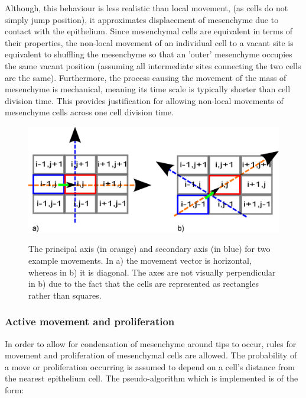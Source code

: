 \documentclass[pdftex,10pt,a4paper,twocolumn]{article}
\begin{document}
Although, this behaviour is less realistic than local movement, (as cells do not simply jump position), it approximates displacement of mesenchyme due to contact with the epithelium. Since mesenchymal cells are equivalent in terms of their properties, the non-local movement of an individual cell to a vacant site is equivalent to shuffling the mesenchyme so that an 'outer' mesenchyme occupies the same vacant position (assuming all intermediate sites connecting the two cells are the same). Furthermore, the process causing the movement of the mass of mesenchyme is mechanical, meaning its time scale is typically shorter than cell division time. This provides justification for allowing non-local movements of mesenchyme cells across one cell division time.

\begin{figure}[t] 
\centering
\scalebox{0.35} 
{\includegraphics{axes.eps}}
\caption{The principal axis (in orange) and secondary axis (in blue) for two example movements. In a) the movement vector is horizontal, whereas in b) it is diagonal. The axes are not visually perpendicular in b) due to the fact that the cells are represented as rectangles rather than squares.}\label{fig:axes}
\end{figure} 

\subsubsection{Active movement and proliferation}
In order to allow for condensation of mesenchyme around tips to occur, rules for movement and proliferation of mesenchymal cells are allowed. The probability of a move or proliferation occurring is assumed to depend on a cell's distance from the nearest epithelium cell. The pseudo-algorithm which is implemented is of the form:
\end{document}
